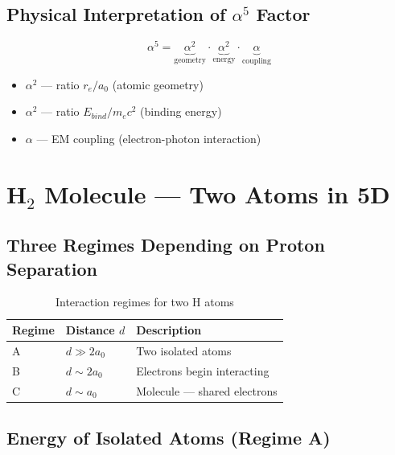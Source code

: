 \documentclass[12pt,a4paper]{article}
\begin{document}
\subsection{Physical Interpretation of $\alpha^5$ Factor}

\begin{equation}
\alpha^5 = \underbrace{\alpha^2}_{\text{geometry}} \cdot \underbrace{\alpha^2}_{\text{energy}} \cdot \underbrace{\alpha}_{\text{coupling}}
\end{equation}

\begin{itemize}
    \item $\alpha^2$ --- ratio $r_e/a_0$ (atomic geometry)
    \item $\alpha^2$ --- ratio $E_{bind}/m_e c^2$ (binding energy)
    \item $\alpha$ --- EM coupling (electron-photon interaction)
\end{itemize}

\section{H$_2$ Molecule --- Two Atoms in 5D}

\subsection{Three Regimes Depending on Proton Separation}

\begin{table}[h]
\centering
\begin{tabular}{@{}lll@{}}
\toprule
\textbf{Regime} & \textbf{Distance $d$} & \textbf{Description} \\
\midrule
A & $d \gg 2a_0$ & Two isolated atoms \\
B & $d \sim 2a_0$ & Electrons begin interacting \\
C & $d \sim a_0$ & Molecule --- shared electrons \\
\bottomrule
\end{tabular}
\caption{Interaction regimes for two H atoms}
\end{table}

\subsection{Energy of Isolated Atoms (Regime A)}
\end{document}

